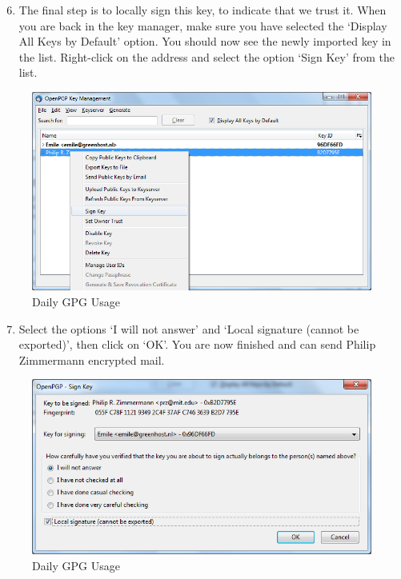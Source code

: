 \begin{enumerate}[1.]
\setcounter{enumi}{5}
\item
  The final step is to locally sign this key, to indicate that we trust
  it. When you are back in the key manager, make sure you have selected
  the `Display All Keys by Default' option. You should now see the newly
  imported key in the list. Right-click on the address and select the
  option `Sign Key' from the list.
\end{enumerate}
\begin{figure}[htbp]
\centering
\includegraphics{daily_gpg_19.png}
\caption{Daily GPG Usage}
\end{figure}

\begin{enumerate}[1.]
\setcounter{enumi}{6}
\item
  Select the options `I will not answer' and `Local signature (cannot be
  exported)', then click on `OK'. You are now finished and can send
  Philip Zimmermann encrypted mail.
\end{enumerate}
\begin{figure}[htbp]
\centering
\includegraphics{daily_gpg_20.png}
\caption{Daily GPG Usage}
\end{figure}


